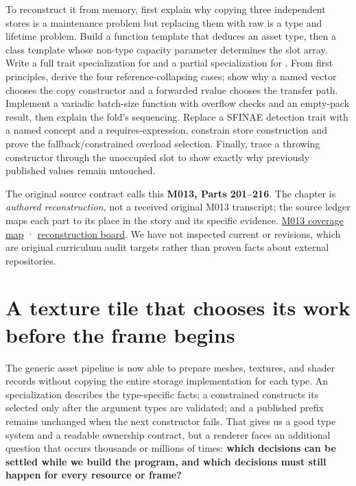 To reconstruct it from memory, first explain why copying three independent stores is a maintenance problem but replacing them with raw  is a type and lifetime problem. Build a function template that deduces an asset type, then a class template whose non-type capacity parameter determines the slot array. Write a full trait specialization for  and a partial specialization for . From first principles, derive the four reference-collapsing cases; show why a named vector chooses the copy constructor and a forwarded rvalue chooses the transfer path. Implement a variadic batch-size function with overflow checks and an empty-pack result, then explain the fold's sequencing. Replace a SFINAE detection trait with a named concept and a requires-expression, constrain store construction and prove the fallback/constrained overload selection. Finally, trace a throwing constructor through the unoccupied slot to show exactly why previously published values remain untouched.

The original source contract calls this \textbf{M013, Parts 201--216}. The chapter is \emph{authored reconstruction}, not a received original M013 transcript; the source ledger maps each part to its place in the story and its specific evidence. \hyperref[appendix-fd090d982a15-m013-parts-201216-generic-asset-preparation-with-constrained-apis]{M013 coverage map} · \hyperref[appendix-960160274237-one-asset-pipeline-many-types-m013-retrieval]{reconstruction board}. We have not inspected current  or  revisions, which are original curriculum audit targets rather than proven facts about external repositories.

\section{A texture tile that chooses its work before the frame begins}\label{01-foundations-i-ch005-a-texture-tile-that-chooses-its-work-before-the-frame-begins}

\hypertarget{01-foundations-i-ch005-a-texture-tile-that-chooses-its-work-before-the-frame-begins}{}

The generic asset pipeline is now able to prepare meshes, textures, and shader records without copying the entire storage implementation for each type. An  specialization describes the type-specific facts; a constrained  constructs its selected  only after the argument types are validated; and a published prefix remains unchanged when the next constructor fails. That gives us a good type system and a readable ownership contract, but a renderer faces an additional question that occurs thousands or millions of times: \textbf{which decisions can be settled while we build the program, and which decisions must still happen for every resource or frame?}

